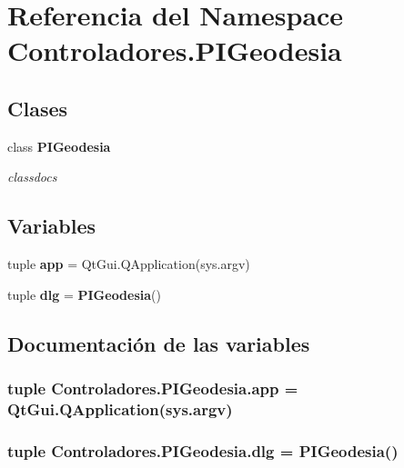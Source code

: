 \section{Referencia del Namespace Controladores.\-P\-I\-Geodesia}
\label{namespaceControladores_1_1PIGeodesia}
\subsection*{Clases}
\begin{DoxyCompactItemize}
\item 
class {\bf P\-I\-Geodesia}
\begin{DoxyCompactList}\small\item\em classdocs \end{DoxyCompactList}\end{DoxyCompactItemize}
\subsection*{Variables}
\begin{DoxyCompactItemize}
\item 
tuple {\bf app} = Qt\-Gui.\-Q\-Application(sys.\-argv)
\item 
tuple {\bf dlg} = {\bf P\-I\-Geodesia}()
\end{DoxyCompactItemize}


\subsection{Documentación de las variables}
\subsubsection[{app}]{\setlength{\rightskip}{0pt plus 5cm}tuple Controladores.\-P\-I\-Geodesia.\-app = Qt\-Gui.\-Q\-Application(sys.\-argv)}\label{namespaceControladores_1_1PIGeodesia_a12884c0b619e6a4ecc59ba11a4f4755e}
\subsubsection[{dlg}]{\setlength{\rightskip}{0pt plus 5cm}tuple Controladores.\-P\-I\-Geodesia.\-dlg = {\bf P\-I\-Geodesia}()}\label{namespaceControladores_1_1PIGeodesia_ab7f7a9eff97dce80082ddcee3a7613f9}
